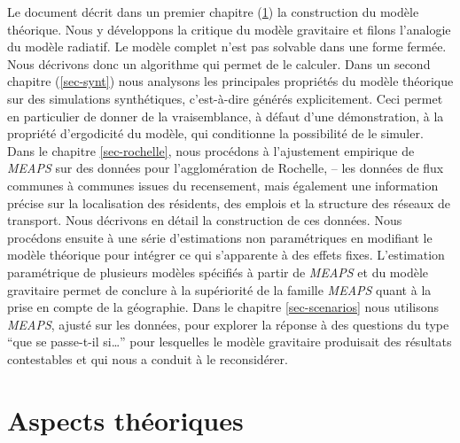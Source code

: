 \documentclass[
  10pt,
  a4paper,
  numbers=noendperiod,
  DIV=9]{scrartcl}
\begin{document}
Le document décrit dans un premier chapitre (\ref{sec-theorie}) la
construction du modèle théorique. Nous y développons la critique du
modèle gravitaire et filons l'analogie du modèle radiatif. Le modèle
complet n'est pas solvable dans une forme fermée. Nous décrivons donc un
algorithme qui permet de le calculer. Dans un second chapitre
(\ref{sec-synt}) nous analysons les principales propriétés du modèle
théorique sur des simulations synthétiques, c'est-à-dire générés
explicitement. Ceci permet en particulier de donner de la vraisemblance,
à défaut d'une démonstration, à la propriété d'ergodicité du modèle, qui
conditionne la possibilité de le simuler. Dans le chapitre
\ref{sec-rochelle}, nous procédons à l'ajustement empirique de
\emph{MEAPS} sur des données pour l'agglomération de Rochelle, -- les
données de flux communes à communes issues du recensement, mais
également une information précise sur la localisation des résidents, des
emplois et la structure des réseaux de transport. Nous décrivons en
détail la construction de ces données. Nous procédons ensuite à une
série d'estimations non paramétriques en modifiant le modèle théorique
pour intégrer ce qui s'apparente à des effets fixes. L'estimation
paramétrique de plusieurs modèles spécifiés à partir de \emph{MEAPS} et
du modèle gravitaire permet de conclure à la supériorité de la famille
\emph{MEAPS} quant à la prise en compte de la géographie. Dans le
chapitre \ref{sec-scenarios} nous utilisons \emph{MEAPS}, ajusté sur les
données, pour explorer la réponse à des questions du type ``que se
passe-t-il si\ldots{}'' pour lesquelles le modèle gravitaire produisait
des résultats contestables et qui nous a conduit à le reconsidérer.


\hypertarget{sec-theorie}{%
\chapter{Aspects théoriques}\label{sec-theorie}}
\end{document}
